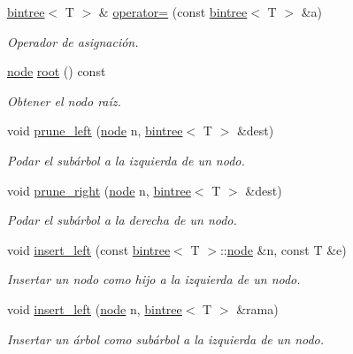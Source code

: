 \begin{DoxyCompactItemize}
\item 
\hyperlink{classbintree}{bintree}$<$ T $>$ \& \hyperlink{classbintree_a188622dd3846630d2f69b11a2eba3896}{operator=} (const \hyperlink{classbintree}{bintree}$<$ T $>$ \&a)
\begin{DoxyCompactList}\small\item\em Operador de asignación. \end{DoxyCompactList}\item 
\hyperlink{classbintree_1_1node}{node} \hyperlink{classbintree_aa5d9c32204880ba5df3b31836d8720da}{root} () const 
\begin{DoxyCompactList}\small\item\em Obtener el nodo raíz. \end{DoxyCompactList}\item 
void \hyperlink{classbintree_a74b4b7570b9b574391742f892520562b}{prune\-\_\-left} (\hyperlink{classbintree_1_1node}{node} n, \hyperlink{classbintree}{bintree}$<$ T $>$ \&dest)
\begin{DoxyCompactList}\small\item\em Podar el subárbol a la izquierda de un nodo. \end{DoxyCompactList}\item 
void \hyperlink{classbintree_ae468b92dd3eb70818ffbd969ff34d811}{prune\-\_\-right} (\hyperlink{classbintree_1_1node}{node} n, \hyperlink{classbintree}{bintree}$<$ T $>$ \&dest)
\begin{DoxyCompactList}\small\item\em Podar el subárbol a la derecha de un nodo. \end{DoxyCompactList}\item 
void \hyperlink{classbintree_a49d681962f17c3ef0b63ddd529d15e6a}{insert\-\_\-left} (const \hyperlink{classbintree}{bintree}$<$ T $>$\-::\hyperlink{classbintree_1_1node}{node} \&n, const T \&e)
\begin{DoxyCompactList}\small\item\em Insertar un nodo como hijo a la izquierda de un nodo. \end{DoxyCompactList}\item 
void \hyperlink{classbintree_a17611b995af1d5421197d155e75e683f}{insert\-\_\-left} (\hyperlink{classbintree_1_1node}{node} n, \hyperlink{classbintree}{bintree}$<$ T $>$ \&rama)
\begin{DoxyCompactList}\small\item\em Insertar un árbol como subárbol a la izquierda de un nodo. \end{DoxyCompactList}\item 

\end{DoxyCompactItemize}
